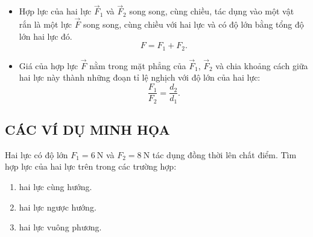 \begin{enumerate}[label=\bfseries\Roman*.]
\begin{center}
	\end{center}
	\begin{itemize}[label=$\bullet$]
		\item Hợp lực của hai lực $\vec{F}_1$ và $\vec{F}_2$ song song, cùng chiều, tác dụng vào một vật rắn là một lực $\vec{F}$ song song, cùng chiều với hai lực và có độ lớn bằng tổng độ lớn hai lực đó.
		$$F=F_1+F_2.$$
		\item Giá của hợp lực $\vec{F}$ nằm trong mặt phẳng của $\vec{F}_1$, $\vec{F}_2$ và chia khoảng cách giữa hai lực này thành những đoạn tỉ lệ nghịch với độ lớn của hai lực:
		$$\dfrac{F_1}{F_2}=\dfrac{d_2}{d_1}.$$
	\end{itemize}
\end{enumerate}
\subsection{CÁC VÍ DỤ MINH HỌA}
\setcounter{ex}{0}
\begin{ex}
Hai lực có độ lớn $F_1=\SI{6}{\newton}$ và $F_2=\SI{8}{\newton}$ tác dụng đồng thời lên chất điểm. Tìm hợp lực của hai lực trên trong các trường hợp:
\begin{enumerate}[label=\alph*)]
	\item hai lực cùng hướng.
	\item hai lực ngược hướng.
	\item hai lực vuông phương.
\end{enumerate}
	\loigiai{}
\end{ex}
\begin{ex}
	\loigiai{}
\end{ex}
